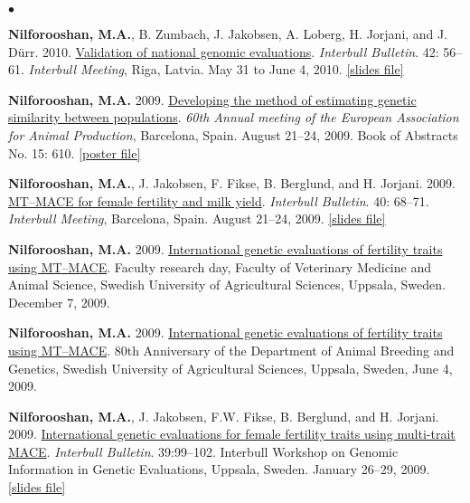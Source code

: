 \documentclass[margin,line]{res}
\newenvironment{list2}{
  \begin{list}{$\bullet$}{%
      \setlength{\itemsep}{0in}
      \setlength{\parsep}{0in} \setlength{\parskip}{0in}
      \setlength{\topsep}{0in} \setlength{\partopsep}{0in}
      \setlength{\leftmargin}{0.2in}}}{\end{list}}
\begin{document}
\begin{resume}
\begin{list2}
\item {\bf Nilforooshan, M.A.}, B. Zumbach, J. Jakobsen, A. Loberg, H. Jorjani, and J. D\"{u}rr. 2010. \href{https://www.researchgate.net/publication/358199921_Validation_of_National_Genomic_Evaluations}{Validation of national genomic evaluations}. {\em Interbull Bulletin}. 42: 56--61. {\em Interbull Meeting}, Riga, Latvia. May 31 to June 4, 2010. \href{https://drive.google.com/file/d/0B2l_izQwJmVpRnlPa0YzS3ZCU1E/view?usp=sharing&resourcekey=0-Tsw-3ZQhJPn8Cm8kG1E6xw}{[slides file]}
\item {\bf Nilforooshan, M.A.} 2009. \href{https://www.researchgate.net/publication/358219264_Developing_the_method_of_estimating_genetic_similarity_between_populations}{Developing the method of estimating genetic similarity between populations}. {\em 60th Annual meeting of the European Association for Animal Production}, Barcelona, Spain. August 21--24, 2009. Book of Abstracts No. 15: 610. \href{https://doi.org/10.13140/RG.2.2.11140.40320}{[poster file]}
\item {\bf Nilforooshan, M.A.}, J. Jakobsen, F. Fikse, B. Berglund, and H. Jorjani. 2009. \href{https://www.researchgate.net/publication/239611615_MT-MACE_for_Female_Fertility_and_Milk_Yield}{MT–MACE for female fertility and milk yield}. {\em Interbull Bulletin}. 40: 68--71. {\em Interbull Meeting}, Barcelona, Spain. August 21--24, 2009. \href{https://drive.google.com/file/d/0B2l_izQwJmVpRTlrOGE3OWluVnc/view?usp=sharing&resourcekey=0-LiA6IgIqSEjLxrAFkXL_Bw}{[slides file]}
\item {\bf Nilforooshan, M.A.} 2009. \href{https://drive.google.com/file/d/0B2l_izQwJmVpUC1TVkx2MVc1ZUE/view?usp=sharing&resourcekey=0-l8dXNYtXDSBuYJHiZwAxZQ}{International genetic evaluations of fertility traits using MT–MACE}. Faculty research day, Faculty of Veterinary Medicine and Animal Science, Swedish University of Agricultural Sciences, Uppsala, Sweden. December 7, 2009.
\item {\bf Nilforooshan, M.A.} 2009. \href{https://drive.google.com/file/d/0B2l_izQwJmVpUC1TVkx2MVc1ZUE/view?usp=sharing&resourcekey=0-l8dXNYtXDSBuYJHiZwAxZQ}{International genetic evaluations of fertility traits using MT–MACE}. 80th Anniversary of the Department of Animal Breeding and Genetics, Swedish University of Agricultural Sciences, Uppsala, Sweden, June 4, 2009.
\item {\bf Nilforooshan, M.A.}, J. Jakobsen, F.W. Fikse, B. Berglund, and H. Jorjani. 2009. \href{https://www.researchgate.net/publication/237781427_International_Genetic_Evaluations_for_Female_Fertility_Traits_Using_Multi-trait_MACE}{International genetic evaluations for female fertility traits using multi-trait MACE}. {\em Interbull Bulletin}. 39:99--102. Interbull Workshop on Genomic Information in Genetic Evaluations, Uppsala, Sweden. January 26--29, 2009. \href{https://drive.google.com/file/d/0B2l_izQwJmVpZG1sZlg2cF9zRWc/view?usp=sharing&resourcekey=0-JmFa0ZnWzZzcCnjVFH3VoA}{[slides file]}

\end{list2}
\end{resume}
\end{document}
